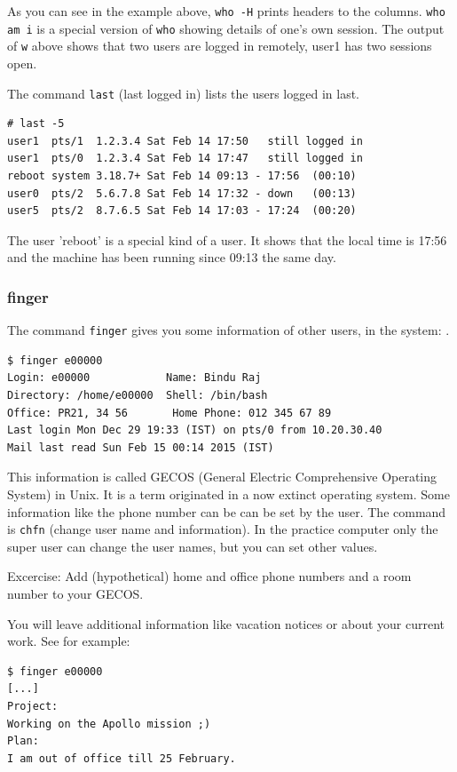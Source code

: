 \documentclass[11pt,a4paper,twoside]{article}
\begin{document}
As you can see in the example above, \texttt{who -H} prints headers to the 
columns. \texttt{who am i} is a special version of \texttt{who} showing 
details of one's own session. The output of \texttt{w} above shows that 
two users are logged in remotely, user1 has two sessions open. 

The command \texttt{last} (last logged in) lists the users logged in
last.

\begin{lstlisting}[frame=single]
# last -5
user1  pts/1  1.2.3.4 Sat Feb 14 17:50   still logged in   
user1  pts/0  1.2.3.4 Sat Feb 14 17:47   still logged in   
reboot system 3.18.7+ Sat Feb 14 09:13 - 17:56  (00:10)    
user0  pts/2  5.6.7.8 Sat Feb 14 17:32 - down   (00:13)    
user5  pts/2  8.7.6.5 Sat Feb 14 17:03 - 17:24  (00:20)    
\end{lstlisting}

The user 'reboot' is a special kind of a user. It shows that the
local time is 17:56 and the machine has been running since 09:13
the same day.

\subsubsection{finger}

The command \texttt{finger} gives you some information of other users,
in the system:
.
\begin{lstlisting}[frame=single]
$ finger e00000
Login: e00000            Name: Bindu Raj
Directory: /home/e00000  Shell: /bin/bash
Office: PR21, 34 56       Home Phone: 012 345 67 89
Last login Mon Dec 29 19:33 (IST) on pts/0 from 10.20.30.40
Mail last read Sun Feb 15 00:14 2015 (IST)
\end{lstlisting}

This information is called GECOS (General Electric Comprehensive Operating 
System) in Unix. It is a term originated in a now extinct operating system. 
Some information like the phone number can be can be set by the user.  The 
command is \texttt{chfn} (change user name and information). In the practice 
computer only the super user can change the user names, but you can set other 
values.

Excercise: Add (hypothetical) home and office phone numbers and a room number 
to your GECOS.

You will leave additional information like vacation notices or about your 
current work. See for example:
\begin{lstlisting}[frame=single]
$ finger e00000
[...]
Project:
Working on the Apollo mission ;)
Plan:
I am out of office till 25 February.
\end{lstlisting}
\end{document}
